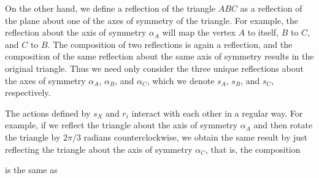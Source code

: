 \begin{example}
    On the other hand, we define a reflection of the triangle \(ABC\) as a
    reflection of the plane about one of the axes of symmetry of the triangle.
    For example, the reflection about the axis of symmetry \(\alpha_A\) will map
    the vertex \(A\) to itself, \(B\) to \(C\), and \(C\) to \(B\). The
    composition of two reflections is again a reflection, and the composition of
    the same reflection about the same axis of symmetry results in the original
    triangle. Thus we need only consider the three unique reflections about the
    axes of symmetry \(\alpha_A\), \(\alpha_B\), and \(\alpha_C\), which we
    denote \(s_A\), \(s_B\), and \(s_C\), respectively.

    The actions defined by \(s_X\) and \(r_i\) interact with each other in a
    regular way. For example, if we reflect the triangle about the axis of
    symmetry \(\alpha_A\) and then rotate the triangle by \(2\pi/3\) radians
    counterclockwise, we obtain the same result by just reflecting the triangle
    about the axis of symmetry \(\alpha_C\), that is, the composition
    \begin{center}
    \end{center}
    is the same as
    \begin{center}
\end{center}
\end{example}
